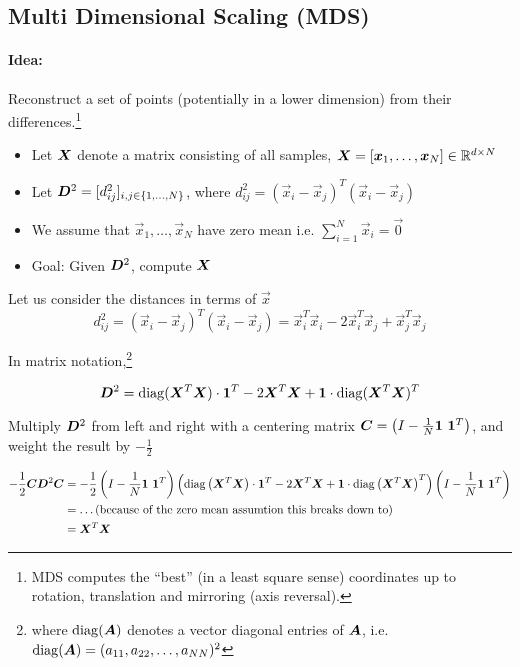 
\subsection{Multi Dimensional Scaling (MDS)}

\paragraph{Idea:} Reconstruct a set of points (potentially in a lower dimension) from their differences.\footnote{MDS computes the ``best'' (in a least square sense) coordinates up to rotation, translation and mirroring (axis reversal).}

\begin{itemize}
    \item  Let \(\bm{X}\) denote a matrix consisting of all samples, \(\bm{X}=[\bm{x}_1, \dots, \bm{x}_N] \in \mathbb{R}^{d \times N}\)
    \item  Let \(\bm{D}^2 = [d_{ij}^2]_{i, j \in \{1, \dots, N\}}\), where \(d_{ij}^2 = (\vec{x}_i - \vec{x}_j)^T (\vec{x}_i - \vec{x}_j)\)
    \item  We assume that \(\vec{x}_1, \dots, \vec{x}_N\) have zero mean i.e. \(\sum_{i=1}^N \vec{x}_i = \vec{0}\)
    \item  Goal: Given \(\bm{D}^2\), compute \(\bm{X}\)
\end{itemize}

Let us consider the distances in terms of \(\vec{x}\)
\[d_{ij}^2 = (\vec{x}_i - \vec{x}_j)^T(\vec{x}_i - \vec{x}_j)=\vec{x}_i^T \vec{x}_i - 2 \vec{x}_i^T \vec{x}_j + \vec{x}_j^T \vec{x}_j \]

In matrix notation,\footnote{where \(\operatorname*{\mathrm{diag}}(\bm{A})\) denotes a vector diagonal entries of \(\bm{A}\), i.e. \(\operatorname*{\mathrm{diag}}(\bm{A}) = (a_{11}, a_{22}, \dots, a_{NN})^2\)}

\[\bm{D}^2 = \operatorname*{\mathrm{diag}}(\bm{X}^T\bm{X}) \cdot \bm{1}^T - 2\bm{X}^T\bm{X} + \bm{1} \cdot \operatorname*{\mathrm{diag}}(\bm{X}^T\bm{X})^T\]


Multiply \(\bm{D}^2\) from left and right with a centering matrix \(\bm{C} = \left(I - \frac{1}{N} \bm{1} \ \bm{1}^T\right)\), and weight the result by \(-\frac{1}{2}\)

\begin{align*}
    -\frac{1}{2}\mat{C}\mat{D}^2\mat{C} &= -\frac{1}{2}\left(I- \frac{1}{N} \vec{1} \ \vec{1}^T\right)\left(\diag\left(\mat{X}^T\mat{X}\right) \cdot \vec{1}^T - 2\mat{X}^T\mat{X} + \vec{1} \cdot\diag\left(\mat{X}^T\mat{X}\right)^T\right)\left(I- \frac{1}{N} \vec{1} \ \vec{1}^T\right)\\
    &= \dots (\text{because of the zero mean assumtion this breaks down to}) \\
    &=\mat{X}^T\mat{X}
\end{align*}

